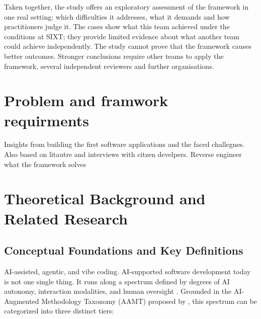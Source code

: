 \documentclass[10pt,a4paper]{article}
\begin{document}
Taken together, the study offers an exploratory assessment of the
framework in one real setting: which difficulties it addresses, what it
demands and how practitioners judge it. The cases show what this team
achieved under the conditions at SIXT; they provide limited evidence
about what another team could achieve independently. The study cannot
prove that the framework causes better outcomes. Stronger conclusions
require other teams to apply the framework, several independent
reviewers and further organisations.


\section{Problem and framwork requirments}
Insights from building the first software applications and the faced challegnes. 
Also based on litautre and interviews with citzen develpers.
Reverse engineer what the framework solves
\section{Theoretical Background and Related Research}

\subsection{Conceptual Foundations and Key Definitions}
AI-assisted, agentic, and vibe coding. AI-supported software development today is not one single thing. It runs along a spectrum defined by degrees of AI autonomy, interaction modalities, and human oversight \parencite{farrag2026,mandl2026,sapkota2025}. 
Grounded in the AI-Augmented Methodology Taxonomy (AAMT) proposed by \textcite{farrag2026}, this spectrum can be categorized into three distinct tiers:
\end{document}
